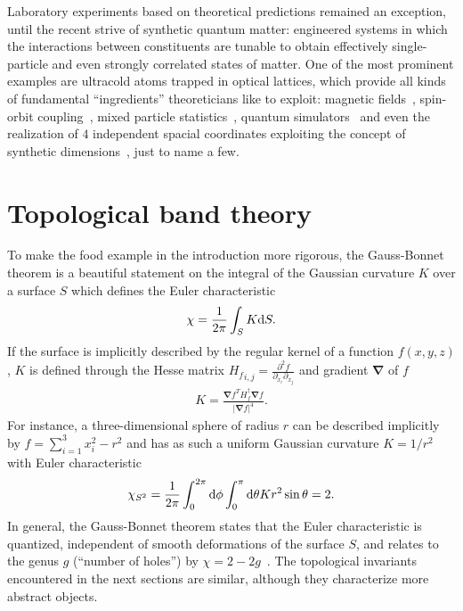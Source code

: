 Laboratory experiments based on theoretical predictions remained an exception, until the recent strive of synthetic quantum matter:
engineered systems in which the interactions between constituents are tunable to obtain effectively single-particle and even strongly correlated states of matter.
One of the most prominent examples are ultracold atoms trapped in optical lattices, which provide all kinds of fundamental ``ingredients'' theoreticians like to exploit: magnetic fields~\cite{Lin2009}, spin-orbit coupling~\cite{Lin2011}, mixed particle statistics~\cite{Ferrari2002}, quantum simulators~\cite{Mazza2012} and even the realization of $4$ independent spacial coordinates exploiting the concept of synthetic dimensions~\cite{Lohse2018}, just to name a few.
%
%
\section{Topological band theory}
\label{sec:topological_band_theory}
%
%
To make the food example in the introduction more rigorous, the Gauss-Bonnet theorem is a beautiful statement on the integral of the Gaussian curvature $K$ over a surface $S$ which defines the Euler characteristic~\cite{Nakahara1990}
\begin{align}
    \chi = \frac1{2\pi}\int_S K\mathrm d S.
    \label{eq:gauss_bonnet_theorem}
\end{align}
If the surface is implicitly described by the regular kernel of a function $f(x,y,z)$, $K$ is defined through the Hesse matrix ${H_f}_{i,j}=\frac{\partial^2 f}{\partial_{x_i}\partial_{x_j}}$ and gradient $\bm\nabla$ of $f$~\cite{Goldman2005}
\begin{align}
    K = \frac{\bm\nabla f^T H_f^\dag \bm\nabla f}{|\bm\nabla f|^4}.
\end{align}
For instance, a three-dimensional sphere of radius $r$ can be described implicitly by $f=\sum_{i=1}^3 x_i^2 - r^2$ and has as such a uniform Gaussian curvature $K=1/r^2$ with Euler characteristic
\begin{align}
    \chi_{S^2} = \frac1{2\pi}\int_0^{2\pi}\mathrm d\phi \int_0^\pi\mathrm d\theta K r^2\sin\theta = 2.
\end{align}
In general, the Gauss-Bonnet theorem states that the Euler characteristic is quantized, independent of smooth deformations of the surface $S$, and relates to the genus $g$ (``number of holes'') by $\chi=2-2g$~\cite{Nakahara1990}.
The topological invariants encountered in the next sections are similar, although they characterize more abstract objects.

